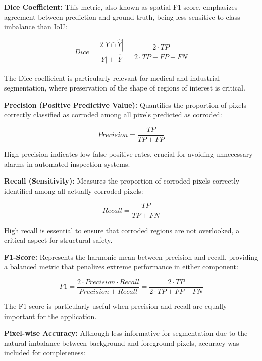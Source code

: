 \documentclass[Journal,letterpaper]{ascelike-new}
\begin{document}
\textbf{Dice Coefficient:} This metric, also known as spatial F1-score, emphasizes agreement between prediction and ground truth, being less sensitive to class imbalance than IoU:

\begin{equation}
Dice = \frac{2|Y \cap \hat{Y}|}{|Y| + |\hat{Y}|} = \frac{2 \cdot TP}{2 \cdot TP + FP + FN}
\label{eq:dice}
\end{equation}

The Dice coefficient is particularly relevant for medical and industrial segmentation, where preservation of the shape of regions of interest is critical.

\textbf{Precision (Positive Predictive Value):} Quantifies the proportion of pixels correctly classified as corroded among all pixels predicted as corroded:

\begin{equation}
Precision = \frac{TP}{TP + FP}
\label{eq:precision}
\end{equation}

High precision indicates low false positive rates, crucial for avoiding unnecessary alarms in automated inspection systems.

\textbf{Recall (Sensitivity):} Measures the proportion of corroded pixels correctly identified among all actually corroded pixels:

\begin{equation}
Recall = \frac{TP}{TP + FN}
\label{eq:recall}
\end{equation}

High recall is essential to ensure that corroded regions are not overlooked, a critical aspect for structural safety.

\textbf{F1-Score:} Represents the harmonic mean between precision and recall, providing a balanced metric that penalizes extreme performance in either component:

\begin{equation}
F1 = \frac{2 \cdot Precision \cdot Recall}{Precision + Recall} = \frac{2 \cdot TP}{2 \cdot TP + FP + FN}
\label{eq:f1score}
\end{equation}

The F1-score is particularly useful when precision and recall are equally important for the application.

\textbf{Pixel-wise Accuracy:} Although less informative for segmentation due to the natural imbalance between background and foreground pixels, accuracy was included for completeness:
\end{document}
